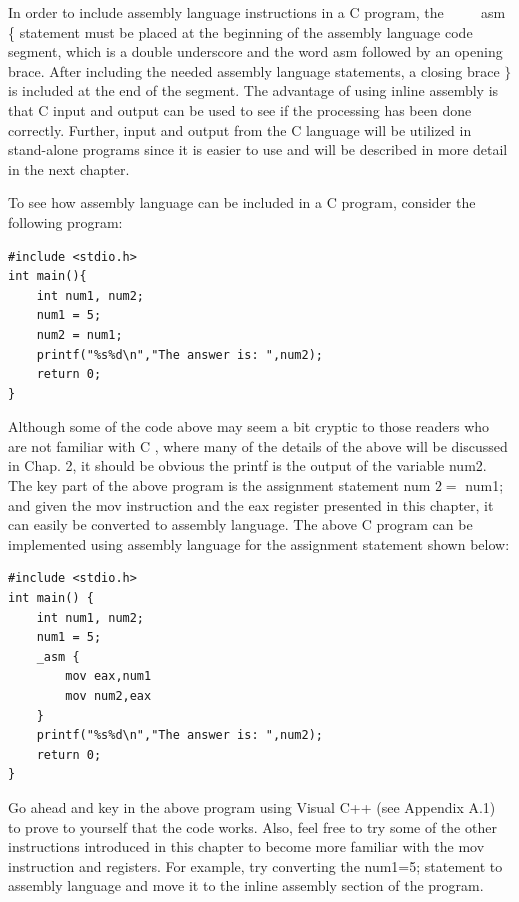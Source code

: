 \documentclass[10pt]{book}
\begin{document}
In order to include assembly language instructions in a C program, the $\qquad$ asm \{ statement must be placed at the beginning of the assembly language code segment, which is a double underscore and the word asm followed by an opening brace. After including the needed assembly language statements, a closing brace $\}$ is included at the end of the segment. The advantage of using inline assembly is that C input and output can be used to see if the processing has been done correctly. Further, input and output from the C language will be utilized in stand-alone programs since it is easier to use and will be described in more detail in the next chapter.


To see how assembly language can be included in a C program, consider the following program:

\begin{verbatim}
#include <stdio.h>
int main(){
    int num1, num2;
    num1 = 5;
    num2 = num1;
    printf("%s%d\n","The answer is: ",num2);
    return 0;
}
\end{verbatim}

Although some of the code above may seem a bit cryptic to those readers who are not familiar with C , where many of the details of the above will be discussed in Chap. 2, it should be obvious the printf is the output of the variable num2. The key part of the above program is the assignment statement num $2=$ num1; and given the mov instruction and the eax register presented in this chapter, it can easily be converted to assembly language. The above C program can be implemented using assembly language for the assignment statement shown below:

\begin{verbatim}
#include <stdio.h>
int main() {
    int num1, num2;
    num1 = 5;
    _asm {
        mov eax,num1
        mov num2,eax
    }
    printf("%s%d\n","The answer is: ",num2);
    return 0;
}
\end{verbatim}

Go ahead and key in the above program using Visual C++ (see Appendix A.1) to prove to yourself that the code works. Also, feel free to try some of the other instructions introduced in this chapter to become more familiar with the mov instruction and registers. For example, try converting the num1=5; statement to assembly language and move it to the inline assembly section of the program.
\end{document}
